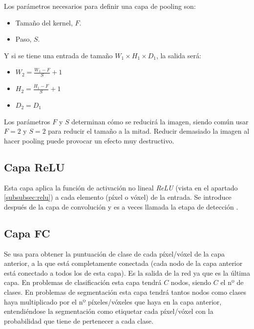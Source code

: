 Los parámetros necesarios para definir una capa de pooling son:
\begin{itemize}
\item Tamaño del kernel, $F$.
\item Paso, $S$.
\end{itemize} 

Y si se tiene una entrada de tamaño $W_1 \times H_1 \times D_1$, la salida será:
\begin{itemize}
\item $W_2 = \frac{W_1 - F}{S} + 1$
\item $H_2 = \frac{H_1 - F}{S} + 1$
\item $D_2 = D_1$
\end{itemize}

Los parámetros $F$ y $S$ determinan cómo se reducirá la imagen, siendo común usar $F=2$ y $S=2$ para reducir el tamaño a la mitad. Reducir demasiado la imagen al hacer pooling puede provocar un efecto muy destructivo.


\subsection{Capa ReLU}\label{cnn_capa_relu}

Esta capa aplica la función de activación no lineal \textit{ReLU} (vista en el apartado \ref{subsubsec:relu}) a cada elemento (píxel o vóxel) de la entrada. Se introduce después de la capa de convolución y es a veces llamada la etapa de detección \cite[335]{Goodfellow2016}.

\subsection{Capa FC}\label{cnn_capa_fc}

Se usa para obtener la puntuación de clase de cada píxel/vóxel de la capa anterior, a la que está completamente conectada (cada nodo de la capa anterior está conectado a todos los de esta capa). Es la salida de la red ya que es la última capa. En problemas de clasificación esta capa tendrá $C$ nodos, siendo $C$ el nº de clases. En problemas de segmentación esta capa tendrá tantos nodos como clases haya multiplicado por el nº píxeles/vóxeles que haya en la capa anterior, entendiéndose la segmentación como etiquetar cada píxel/vóxel con la probabilidad que tiene de pertenecer a cada clase.

